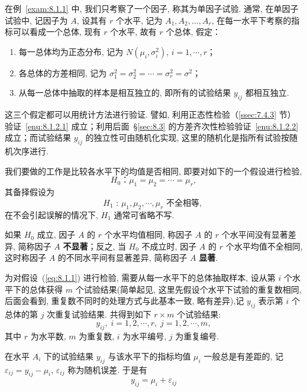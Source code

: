 在例~\ref{exam:8.1.1} 中, 我们只考察了一个因子, 称其为单因子试验. 通常, 在单因子试验中, 记因子为 $A$, 设其有 $r$ 个水平, 记为 $A_1,A_2,\ldots,A_r$, 在每一水平下考察的指标可以看成一个总体, 现有 $r$ 个水平, 故有 $r$ 个总体, 假定：

\begin{enumerate}
  \item 每一总体均为正态分布, 记为 $N(\mu_i, \sigma_i^2)$, $i=1,\cdots,r$；\label{enu:8.1.2.1}
  \item 各总体的方差相同, 记为 $\sigma_1^2 = \sigma_2^2=\cdots=\sigma_r^2=\sigma^2$；\label{enu:8.1.2.2}
  \item 从每一总体中抽取的样本是相互独立的, 即所有的试验结果 $y_{ij}$ 都相互独立.
\end{enumerate}

这三个假定都可以用统计方法进行验证. 譬如, 利用正态性检验（\ref{ssec:7.4.3} 节）验证~\ref{enu:8.1.2.1} 成立；利用后面~\S\ref{sec:8.3} 的方差齐次性检验验证~\ref{enu:8.1.2.2} 成立；而试验结果 $y_{ij}$ 的独立性可由随机化实现, 这里的随机化是指所有试验按随机次序进行.

我们要做的工作是比较各水平下的均值是否相同, 即要对如下的一个假设进行检验,
\begin{equation}
  H_0 \text{：} \mu_1 = \mu_2 = \cdots = \mu_r,\label{eq:8.1.1}
\end{equation}
其备择假设为
\begin{equation*}
  H_1 \text{ : } \mu_1,\mu_2,\cdots,\mu_r \text{ 不全相等, }
\end{equation*}
在不会引起误解的情况下, $H_1$ 通常可省略不写.

如果 $H_0$ 成立, 因子 $A$ 的 $r$ 个水平均值相同, 称因子 $A$ 的 $r$ 个水平间没有显著差异, 简称因子 $A$ \textbf{不显著}；反之, 当 $H_0$ 不成立时, 因子 $A$ 的 $r$ 个水平均值不全相同, 这时称因子 $A$ 的不同水平间有显著差异, 简称因子 $A$ \textbf{显著}.

为对假设~(\ref{eq:8.1.1}) 进行检验, 需要从每一水平下的总体抽取样本, 设从第 $i$ 个水平下的总体获得 $m$ 个试验结果(简单起见, 这里先假设个水平下试验的重复数相同, 后面会看到, 重复数不同时的处理方式与此基本一致, 略有差异),记 $y_{ij}$ 表示第 $i$ 个总体的第 $j$ 次重复试验结果. 共得到如下 $r \times m$ 个试验结果:
\begin{equation*}
  y_{ij}, \; i=1,2,\cdots,r, \; j = 1,2,\cdots,m,
\end{equation*}
其中 $r$ 为水平数, $m$ 为重复数, $i$ 为水平编号, $j$ 为重复编号.

在水平 $A_i$ 下的试验结果 $y_{ij}$ 与该水平下的指标均值 $\mu_i$ 一般总是有差距的, 记 $\varepsilon_{ij} = y_{ij} - \mu_i$, $\varepsilon_{ij}$ 称为随机误差. 于是有
\begin{equation}
  \label{eq:8.1.2}
  y_{ij} = \mu_i + \varepsilon_{ij}
\end{equation}

